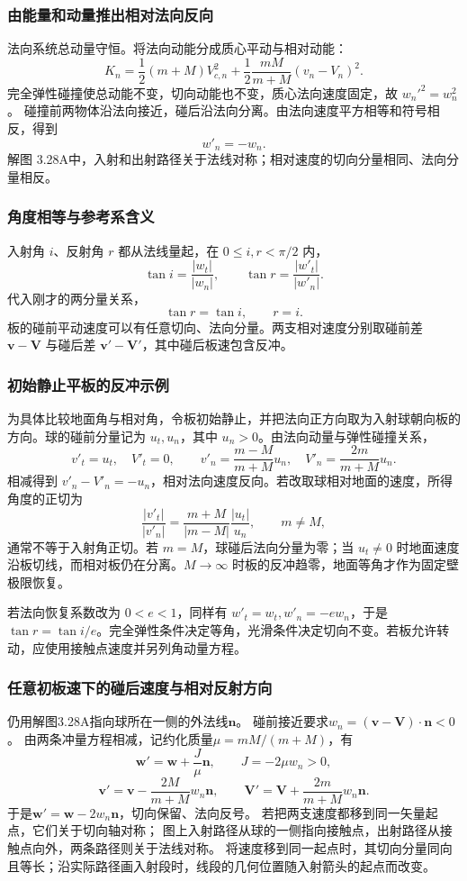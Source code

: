 \documentclass[UTF8,fontset=fandol,a4paper,11pt]{ctexart}
\newcommand{\vect}[1]{\bm{#1}}
\begin{document}
\subsubsection*{由能量和动量推出相对法向反向}
法向系统总动量守恒。将法向动能分成质心平动与相对动能：
\[
K_n=\frac12(m+M)V_{c,n}^2
+\frac12\frac{mM}{m+M}(v_n-V_n)^2.
\]
完全弹性碰撞使总动能不变，切向动能也不变，质心法向速度固定，故 $w_n'^2=w_n^2$。
碰撞前两物体沿法向接近，碰后沿法向分离。由法向速度平方相等和符号相反，得到
\[
w'_n=-w_n.
\]
解图 3.28A中，入射和出射路径关于法线对称；相对速度的切向分量相同、法向分量相反。

\subsubsection*{角度相等与参考系含义}
入射角 $i$、反射角 $r$ 都从法线量起，在 $0\leq i,r<\pi/2$ 内，
\[
\tan i=\frac{|w_t|}{|w_n|},\qquad
\tan r=\frac{|w'_t|}{|w'_n|}.
\]
代入刚才的两分量关系，
\[
\tan r=\tan i,\qquad\boxed{r=i}.
\]
板的碰前平动速度可以有任意切向、法向分量。两支相对速度分别取碰前差 $\vect v-\vect V$ 与碰后差 $\vect v'-\vect V'$，其中碰后板速包含反冲。

\subsubsection*{初始静止平板的反冲示例}
为具体比较地面角与相对角，令板初始静止，并把法向正方向取为入射球朝向板的方向。球的碰前分量记为 $u_t,u_n$，其中 $u_n>0$。由法向动量与弹性碰撞关系，
\[
v'_t=u_t,\quad V'_t=0,\qquad
v'_n=\frac{m-M}{m+M}u_n,\quad
V'_n=\frac{2m}{m+M}u_n.
\]
相减得到 $v'_n-V'_n=-u_n$，相对法向速度反向。若改取球相对地面的速度，所得角度的正切为
\[
\frac{|v'_t|}{|v'_n|}
=\frac{m+M}{|m-M|}\frac{|u_t|}{u_n},\qquad m\ne M,
\]
通常不等于入射角正切。若 $m=M$，球碰后法向分量为零；当 $u_t\ne0$ 时地面速度沿板切线，而相对板仍在分离。$M\to\infty$ 时板的反冲趋零，地面等角才作为固定壁极限恢复。

若法向恢复系数改为 $0<e<1$，同样有 $w'_t=w_t,w'_n=-ew_n$，于是 $\tan r=\tan i/e$。完全弹性条件决定等角，光滑条件决定切向不变。若板允许转动，应使用接触点速度并另列角动量方程。
\subsubsection*{任意初板速下的碰后速度与相对反射方向}
仍用解图3.28A指向球所在一侧的外法线$\vect n$。
碰前接近要求$w_n=(\vect v-\vect V)\cdot\vect n<0$。
由两条冲量方程相减，记约化质量$\mu=mM/(m+M)$，有
\[
\vect w'=\vect w+\frac J\mu\vect n,\qquad
J=-2\mu w_n>0,
\]
\[
\boxed{\vect v'=\vect v-\frac{2M}{m+M}w_n\vect n},\qquad
\boxed{\vect V'=\vect V+\frac{2m}{m+M}w_n\vect n}.
\]
于是$\vect w'=\vect w-2w_n\vect n$，切向保留、法向反号。
若把两支速度都移到同一矢量起点，它们关于切向轴对称；
图上入射路径从球的一侧指向接触点，出射路径从接触点向外，两条路径则关于法线对称。
将速度移到同一起点时，其切向分量同向且等长；沿实际路径画入射段时，线段的几何位置随入射箭头的起点而改变。
\end{document}
